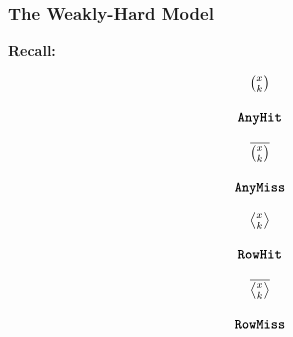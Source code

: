 \begin{frame}
    \frametitle{The Weakly-Hard Model}
    \textbf{Recall:}

    \begin{minipage}[c]{0.23\textwidth}
        \centering
        \begin{equation*}
            \begin{matrix}
                {\Large \binom{x_{}}{k_{}}} \\
                            \\
                \texttt{\textbf{AnyHit}}{}
            \end{matrix}
        \end{equation*}\newline
    \end{minipage}\hfill
    \begin{minipage}[c]{0.23\textwidth}
        \centering
        \begin{equation*}
            \begin{matrix}
                {\Large \overline{\binom{x_{}}{k_{}}}}   \\
                            \\
                \texttt{\textbf{AnyMiss}}{}
            \end{matrix}
        \end{equation*}\newline
    \end{minipage}\hfill
    \begin{minipage}[c]{0.23\textwidth}
        \centering
        \begin{equation*}
            \begin{matrix}
                {\Large \rowhit{}}   \\
                            \\
                \tRH{}
            \end{matrix}
        \end{equation*}\newline
    \end{minipage}\hfill
    \begin{minipage}[c]{0.23\textwidth}
        \centering
        \begin{equation*}
            \begin{matrix}
                {\Large \rowmiss{}}   \\
                            \\
                \tRM{}
            \end{matrix}
        \end{equation*}\newline
    \end{minipage}


\end{frame}
